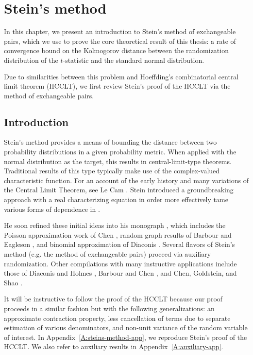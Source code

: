 \chapter{Stein's method}
\label{C:steins-method}
In this chapter, we present an introduction to
Stein's method of exchangeable pairs, which we use to prove the core
theoretical result of this thesis: a rate of convergence bound on the
Kolmogorov distance between the randomization distribution of the $t$-statistic
and the standard normal distribution.

Due to similarities between this problem and Hoeffding's combinatorial central
limit theorem (HCCLT), we first review Stein's proof of the HCCLT via the method
of exchangeable pairs.

\section{Introduction}
\label{S:steins-method-introduction}
Stein's method provides a means
of bounding the distance between two probability distributions in a
given probability metric.  When applied with the normal distribution
as the target, this results in central-limit-type theorems.  Traditional
results of this type typically make use of the complex-valued characteristic
function.  For an account of the early history and many variations of the
Central Limit Theorem, see Le Cam \cite{cam1986central}.
Stein introduced a groundbreaking approach with a real characterizing
equation in order more effectively tame various forms of dependence in
\cite{stein1972bound}.

He soon refined these initial ideas into his monograph
\cite{stein1986approximate}, which includes the Poisson approximation
work of Chen \cite{chen1975poisson}, random graph results of Barbour
and Eagleson \cite{barbour1985multiple}, and binomial approximation of
Diaconis \cite{diaconis1977distribution}.  Several flavors of Stein's
method (e.g. the method of exchangeable pairs) proceed via auxiliary
randomization.  Other compilations with many instructive applications
include those of Diaconis and Holmes \cite{diaconis2004stein}, Barbour
and Chen \cite{barbour2005introduction, barbour2005stein}, and
Chen, Goldstein, and Shao \cite{chen2010normal}.

It will be instructive to follow the proof of the HCCLT
because our proof proceeds in a similar fashion but with the following
generalizations: an approximate contraction property, less
cancellation of terms due to separate estimation of various
denominators, and non-unit variance of the random variable of interest.
In Appendix~\ref{A:steins-method-app}, we reproduce
Stein's \cite{stein1986approximate} proof of the HCCLT.
We also refer to auxiliary results in Appendix~\ref{A:auxiliary-app}.

